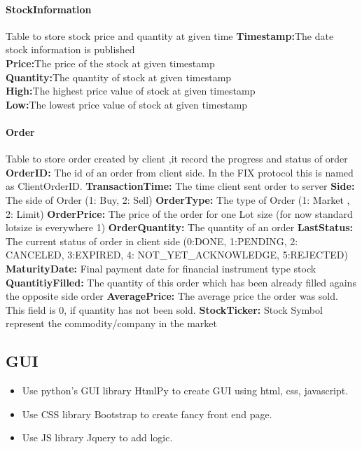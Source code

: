 \documentclass[a4paper, 11pt]{article}
\begin{document}
\paragraph*{StockInformation}
Table to store stock price and quantity at given time
\textbf{Timestamp:}The date stock information is published
\\
\textbf{Price:}The price of the stock at given timestamp 
\\
\textbf{Quantity:}The quantity of stock at given timestamp 
\\
\textbf{High:}The highest price value of stock at given timestamp
\\
\textbf{Low:}The lowest price value of stock at given timestamp
\\

\paragraph*{Order}
Table to store order created by client ,it record the progress and status of order
\textbf{OrderID:} The id of an order from client side. In the FIX protocol this is named as ClientOrderID.
\textbf{TransactionTime:} The time client sent order to server 
\textbf{Side:} The side of Order (1: Buy, 2: Sell)
\textbf{OrderType:} The type of Order (1: Market , 2: Limit)
\textbf{OrderPrice:} The price of the order for one Lot size (for now standard lotsize is everywhere 1)
\textbf{OrderQuantity:} The quantity of an order
\textbf{LastStatus:} The current status of order in client side (0:DONE, 1:PENDING, 2: CANCELED, 3:EXPIRED, 4: NOT\_YET\_ACKNOWLEDGE, 5:REJECTED)
\textbf{MaturityDate:} Final payment date for financial instrument type stock
\textbf{QuantitiyFilled:} The quantity of this order which has been already filled agains the opposite side order
\textbf{AveragePrice:} The average price the order was sold. This field is 0, if quantity has  not been sold.
\textbf{StockTicker:}  Stock Symbol represent the commodity/company in the market

\subsection*{GUI}
\begin{itemize}
  \item Use python's GUI library HtmlPy to create GUI using html, css, javascript.
  \item Use CSS library Bootstrap to create fancy front end page. 
  \item Use JS library Jquery to add logic.
\end{itemize}
\end{document}

